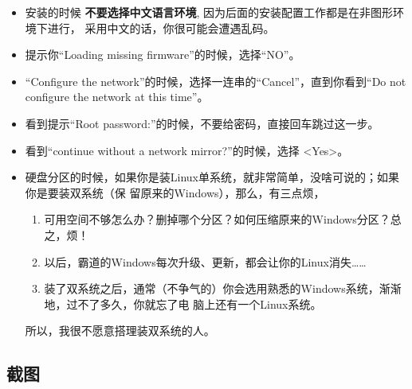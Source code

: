 \documentclass{wx672ctexart} \usepackage{hyperref}
\begin{document}
\begin{enumerate}
\begin{itemize}
\item 安装的时候 \textbf{不要选择中文语言环境}, 因为后面的安装配置工作都是在非图形环境下进行，
采用中文的话，你很可能会遭遇乱码。
\item 提示你“Loading missing firmware”的时候，选择“NO”。
\item “Configure the network”的时候，选择一连串的“Cancel”，直到你看到“Do not configure the
network at this time”。
\item 看到提示“Root password:”的时候，不要给密码，直接回车跳过这一步。
\item 看到“continue without a network mirror?”的时候，选择 <Yes>。
\item 硬盘分区的时候，如果你是装Linux单系统，就非常简单，没啥可说的；如果你是要装双系统（保
留原来的Windows），那么，有三点烦，
\begin{enumerate}
\item 可用空间不够怎么办？删掉哪个分区？如何压缩原来的Windows分区？总之，烦！
\item 以后，霸道的Windows每次升级、更新，都会让你的Linux消失……
\item 装了双系统之后，通常（不争气的）你会选用熟悉的Windows系统，渐渐地，过不了多久，你就忘了电
脑上还有一个Linux系统。
\end{enumerate}
所以，我很不愿意搭理装双系统的人。
\end{itemize}
\end{enumerate}
\subsection{截图}
\label{sec:orgc37e52e}
\end{document}

